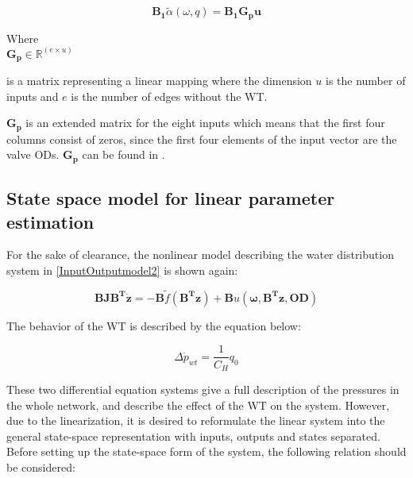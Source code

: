 \begin{equation}
\bm{B_1} \tilde{\alpha}(\omega, q) = \bm{B_1} \bm{G_p} \bm{u}
\label{gamma_lin}
\end{equation}

\begin{minipage}[t]{0.24\textwidth}
Where\\
\hspace*{8mm} $\bm{G_p} \in \bm{\mathbb{R}}^{(e \times u)} $ 
\end{minipage}
\begin{minipage}[t]{0.74\textwidth}
\vspace*{2mm}
is a matrix representing a linear mapping where the dimension $u$ is the number of inputs and $e$ is the number of edges without the WT. 
\end{minipage} 

$\bm{G_p}$ is an extended matrix for the eight inputs which means that the first four columns consist of zeros, since the first four elements of the input vector are the valve ODs. $\bm{G_p}$ can be found in .

\subsection{State space model for linear parameter estimation}
 \label{SystemLin}

For the sake of clearance, the nonlinear model describing the water distribution system in \eqref{InputOutputmodel2} is shown again:  

\begin{equation}
\bm{B} \bm{J} \bm{B^T} \bm{\dot{z}} = - \bm{B} \tilde f(\bm{B^T}\bm{z}) + \bm{B} u(\bm{\omega},\bm{B^T}\bm{z},\bm{OD}) 
 \label{InputOutputmodel3}
\end{equation}

The behavior of the WT is described by the equation below: 

\begin{equation}
\Delta \dot{p}_{wt} = \frac{1}{C_H} q_0
 \label{WT_eq}
\end{equation}

These two differential equation systems give a full description of the pressures in the whole network, and  describe the effect of the WT on the system. However, due to the linearization, it is desired to reformulate the linear system into the general state-space representation with inputs, outputs and states separated. 
\\
Before setting up the state-space form of the system, the following relation should be considered: 

